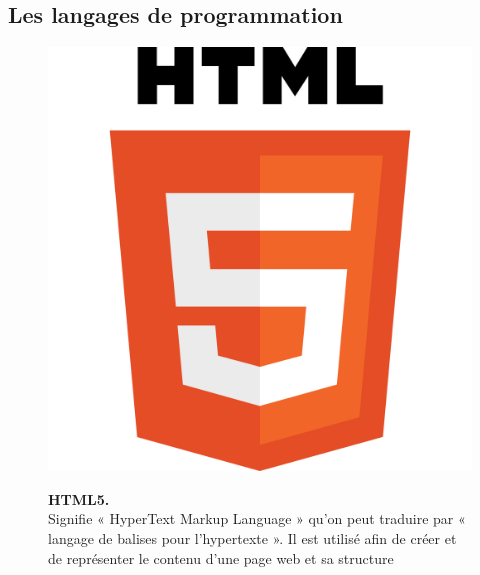 \subsection{Les langages de programmation}
\begin{figure}[H]
    \centering
    \begin{minipage}[c]{0.3\textwidth}
      \includegraphics[width=\linewidth]{projet/images/diagramme de sequance/images/HTML5.png}
    \end{minipage}
    \hspace{1cm}
    \begin{minipage}[c]{0.6\textwidth}
        \textbf{HTML5.}\\[0.5em]
        Signifie « HyperText Markup Language » qu'on peut traduire par « langage de balises pour l'hypertexte ». Il est utilisé afin de créer et de représenter le contenu d'une page web et sa structure\cite{ref9}
    \end{minipage}
\end{figure}

\vspace{0.5cm}

